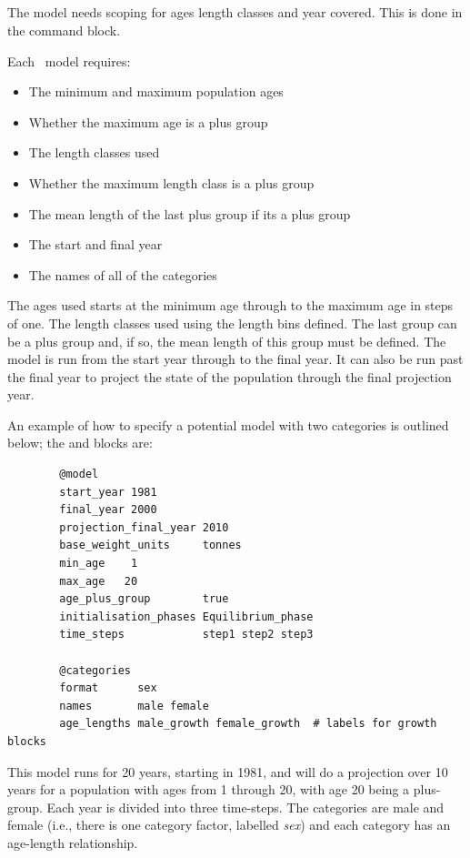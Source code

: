 \subsection{}\label{sec:Model}

The model needs scoping for \ifAgeBased ages \else length classes \fi  and year covered. This is done in the  command block.

Each \CNAME\ model requires:

\begin{itemize}
\ifAgeBased
\item The minimum and maximum population ages
\item Whether the maximum age is a plus group
\else 
\item The length classes used
\item Whether the maximum length class is a plus group
\item The mean length of the last plus group if its a plus group
\fi
\item The start and final year
\item The names of all of the categories
\end{itemize}

\ifAgeBased The ages used starts at the minimum age through to the maximum age in steps of one. \else The length classes used using the length bins defined. The last group can be a plus group and, if so, the mean length of this group must be defined. \fi The model is run from the start year through to the final year. It can also be run past the final year to project the state of the population through the final projection year.

An example of how to specify a potential model with two categories is outlined below;  the  and  blocks are:

\ifAgeBased 
{\small{\begin{verbatim}
		@model
		start_year 1981
		final_year 2000
		projection_final_year 2010
		base_weight_units     tonnes
		min_age    1
		max_age   20
		age_plus_group        true
		initialisation_phases Equilibrium_phase
		time_steps            step1 step2 step3

		@categories
		format      sex
		names       male female
		age_lengths male_growth female_growth  # labels for growth blocks
\end{verbatim}}}

This model runs for 20 years, starting in 1981, and will do a projection over 10 years for a population with ages from  1 through 20, with age 20 being a plus-group. Each year is divided into three time-steps. The categories are male and female (i.e., there is one category factor, labelled \textit{sex}) and each category has an age-length relationship.


